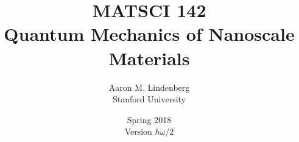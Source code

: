 \documentclass[12pt, english]{book}
\title{{\LARGE \textbf{MATSCI 142}} \\ Quantum Mechanics of Nanoscale Materials}
\author{Aaron M. Lindenberg \\ Stanford University}
\date{Spring 2018 \\ Version $\hbar\omega/2$}
\begin{document}
	
\frontmatter %
\let\cleardoublepage\clearpage %
\maketitle
\tableofcontents


%

\mainmatter 		%












\appendix








\end{document}
